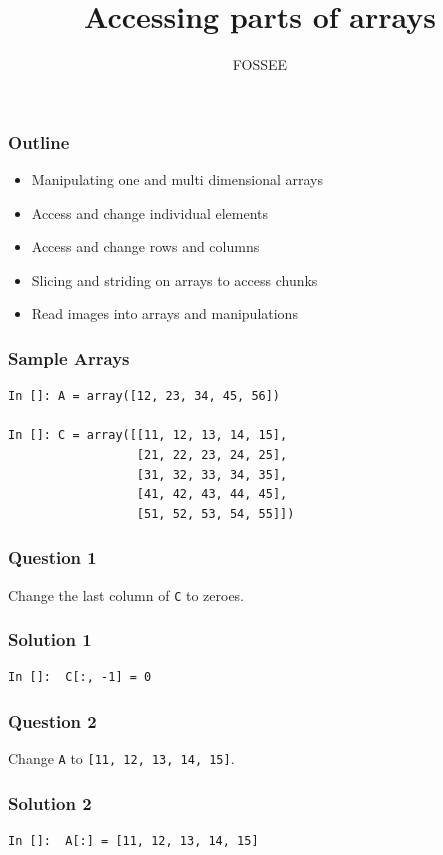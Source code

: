 \documentclass[presentation]{beamer}
\title{Accessing parts of arrays}
\author{FOSSEE}
\date{}
\begin{document}
\maketitle









\begin{frame}
\frametitle{Outline}
\label{sec-1}

\begin{itemize}
\item Manipulating one and multi dimensional arrays
\item Access and change individual elements
\item Access and change rows and columns
\item Slicing and striding on arrays to access chunks
\item Read images into arrays and manipulations
\end{itemize}
\end{frame}
\begin{frame}[fragile]
\frametitle{Sample Arrays}
\label{sec-2}

\lstset{language=Python}
\begin{lstlisting}
In []: A = array([12, 23, 34, 45, 56])

In []: C = array([[11, 12, 13, 14, 15],
                  [21, 22, 23, 24, 25],
                  [31, 32, 33, 34, 35],
                  [41, 42, 43, 44, 45],
                  [51, 52, 53, 54, 55]])
\end{lstlisting}
\end{frame}
\begin{frame}
\frametitle{Question 1}
\label{sec-3}

  Change the last column of \texttt{C} to zeroes. 
\end{frame}
\begin{frame}[fragile]
\frametitle{Solution 1}
\label{sec-4}

\lstset{language=Python}
\begin{lstlisting}
In []:  C[:, -1] = 0
\end{lstlisting}
\end{frame}
\begin{frame}
\frametitle{Question 2}
\label{sec-5}

  Change \texttt{A} to \texttt{[11, 12, 13, 14, 15]}. 
\end{frame}
\begin{frame}[fragile]
\frametitle{Solution 2}
\label{sec-6}

\lstset{language=Python}
\begin{lstlisting}
In []:  A[:] = [11, 12, 13, 14, 15]
\end{lstlisting}
\end{frame}
\end{document}
